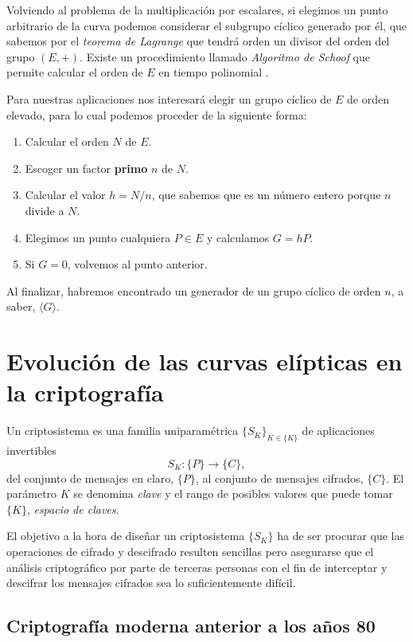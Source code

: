 \documentclass[
  a4paper,
  12pt,
  spanish,
]{scrartcl}
\begin{document}
Volviendo al problema de la multiplicación por escalares, si elegimos un punto arbitrario de la curva podemos considerar el subgrupo cíclico generado por él, que sabemos por el \textit{teorema de Lagrange} que tendrá orden un divisor del orden del grupo $(E, +)$. Existe un procedimiento llamado \textit{Algoritmo de Schoof} que permite calcular el orden de $E$ en tiempo polinomial \parencite{schoof_points_1995}.

Para nuestras aplicaciones nos interesará elegir un grupo cíclico de $E$ de orden elevado, para lo cual podemos proceder de la siguiente forma:

\begin{enumerate}
	\item Calcular el orden $N$ de $E$.
	\item Escoger un factor \textbf{primo} $n$ de $N$.
	\item Calcular el valor $h = N/n$, que sabemos que es un número entero porque $n$ divide a $N$.
	\item Elegimos un punto cualquiera $P \in E$ y calculamos $G = hP$.
	\item Si $G=0$, volvemos al punto anterior.
\end{enumerate}

Al finalizar, habremos encontrado un generador de un grupo cíclico de orden $n$, a saber, $\langle G \rangle$.

\section{Evolución de las curvas elípticas en la criptografía}

Un criptosistema es una familia uniparamétrica \(\{S_K\}_{K \in \{K\}}\) de aplicaciones invertibles \[S_K: \{P\} \to \{C\},\] del conjunto de mensajes en claro, \(\{P\}\), al conjunto de mensajes cifrados, \(\{C\}\). 
El parámetro \(K\) se denomina \textit{clave} y el rango de posibles valores que puede tomar \(\{K\}\), \textit{espacio de claves}.

El objetivo a la hora de diseñar un criptosistema \(\{S_K\}\) ha de ser procurar que las operaciones de cifrado y descifrado resulten sencillas pero asegurarse que el análisis criptográfico por parte de terceras personas con el fin de interceptar y descifrar los mensajes cifrados sea lo suficientemente difícil.

\subsection{Criptografía moderna anterior a los años 80}
\end{document}
